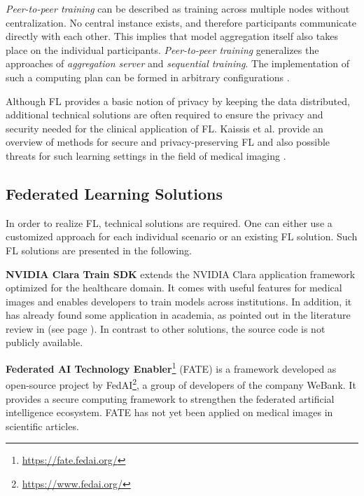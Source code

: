 \textit{Peer-to-peer training} can be described as training across multiple nodes without centralization. No central instance exists, and therefore participants communicate directly with each other. This implies that model aggregation itself also takes place on the individual participants.
\textit{Peer-to-peer training} generalizes the approaches of \textit{aggregation server} and \textit{sequential training}. The implementation of such a computing plan can be formed in arbitrary configurations \citep{Chang2018DistributedImaging, Lalitha2019Peer-to-peerGraphs, Roy2019BrainTorrent:Learning}.

Although FL provides a basic notion of privacy by keeping the data distributed, additional technical solutions are often required to ensure the privacy and security needed for the clinical application of FL. Kaissis et al. provide an overview of methods for secure and privacy-preserving FL and also possible threats for such learning settings in the field of medical imaging \citep{Kaissis2020SecureImaging}.



\subsection{Federated Learning Solutions}
\label{subsec:SolutionsFL}

In order to realize FL, technical solutions are required. One can either use a customized approach for each individual scenario or an existing FL solution. Such FL solutions are presented in the following. %

\textbf{NVIDIA Clara Train SDK}
extends the NVIDIA Clara application framework optimized for the healthcare domain. It comes with useful features for medical images and enables developers to train models across institutions. In addition, it has already found some application in academia, as pointed out in the literature review in  (see page \pageref{subsec:LitRev}). In contrast to other solutions, the source code is not publicly available.

\textbf{Federated AI Technology Enabler}\footnote{\url{https://fate.fedai.org/}}
(FATE) is a framework developed as open-source project by FedAI\footnote{\url{https://www.fedai.org/}}, a group of developers of the company WeBank. It provides a secure computing framework to strengthen the federated artificial intelligence ecosystem.
FATE has not yet been applied on medical images in scientific articles.


